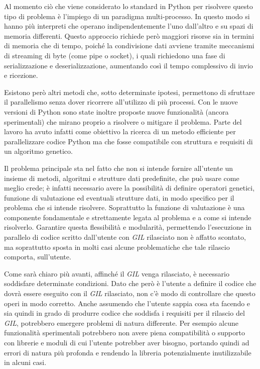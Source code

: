 Al momento ciò che viene considerato lo standard in Python per risolvere questo
tipo di problema è l'impiego di un paradigma multi-processo. In questo modo si
hanno più interpreti che operano indipendentemente l'uno dall'altro e su spazi
di memoria differenti. Questo approccio richiede però maggiori risorse sia in
termini di memoria che di tempo, poiché la condivisione dati avviene tramite
meccanismi di streaming di byte (come pipe o socket), i quali richiedono una
fase di serializzazione e deserializzazione, aumentando così il tempo
complessivo di invio e ricezione.

Esistono però altri metodi che, sotto determinate ipotesi, permettono di
sfruttare il parallelismo senza dover ricorrere all'utilizzo di più processi.
Con le nuove versioni di Python sono state inoltre proposte nuove funzionalità
(ancora sperimentali) che mirano proprio a risolvere o mitigare il problema.
Parte del lavoro ha avuto infatti come obiettivo la ricerca di un metodo
efficiente per parallelizzare codice Python ma che fosse compatibile con
struttura e requisiti di un algoritmo genetico.

Il problema principale sta nel fatto che non si intende fornire all'utente un
insieme di metodi, algoritmi e strutture dati predefinite, che può usare come
meglio crede; è infatti necessario avere la possibilità di definire operatori
genetici, funzione di valutazione ed eventuali strutture dati, in modo specifico
per il problema che si intende risolvere. Soprattutto la funzione di valutazione
è una componente fondamentale e strettamente legata al problema e a come si
intende risolverlo. Garantire questa flessibilità e modularità, permettendo
l'esecuzione in parallelo di codice scritto dall'utente con \textit{GIL}
rilasciato non è affatto scontato, ma soprattutto sposta in molti casi alcune
problematiche che tale rilascio comporta, sull'utente.

Come sarà chiaro più avanti, affinché il \textit{GIL} venga rilasciato, è
necessario soddisfare determinate condizioni. Dato che però è l'utente a
definire il codice che dovrà essere eseguito con il \textit{GIL} rilasciato,
non c'è modo di controllare che questo operi in modo corretto. Anche assumendo
che l'utente sappia cosa sta facendo e sia quindi in grado di produrre codice
che soddisfa i requisiti per il rilascio del \textit{GIL}, potrebbero emergere
problemi di natura differente. Per esempio alcune funzionalità sperimentali
potrebbero non avere piena compatibilità o supporto con librerie e moduli di
cui l'utente potrebber aver bisogno, portando quindi ad errori di natura più
profonda e rendendo la libreria potenzialmente inutilizzabile in alcuni casi.

